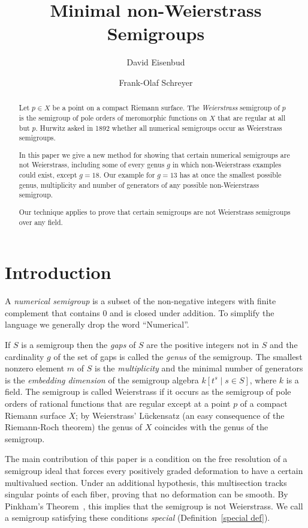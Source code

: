 \documentclass[twoside,12pt, leqno]{amsart}
\author[David Eisenbud]{David Eisenbud}
\author[Frank-Olaf Schreyer]{Frank-Olaf Schreyer}
\title{Minimal  non-Weierstrass Semigroups}
\theoremstyle{definition}
\begin{document}
\begin{abstract}
Let $p\in X$ be a point on a compact Riemann surface. The \emph{Weierstrass} semigroup of $p$ is  the semigroup of pole orders
of meromorphic functions on $X$ that are regular at all but $p$. Hurwitz asked in 1892 
whether all numerical semigroups occur as Weierstrass semigroups. 

In this paper we give a new method  for showing that certain numerical semigroups are not Weierstrass, including some
of every genus $g$ in which non-Weierstrass examples could exist, except $g =18$. Our example for $g=13$ has at once the smallest possible genus, multiplicity
and number of generators of any possible non-Weierstrass semigroup.
 
 Our technique applies to prove that certain semigroups are not Weierstrass semigroups over any field. 
\end{abstract}
\maketitle

\section*{Introduction}

A \emph{numerical semigroup} is a subset of the non-negative integers
with finite complement that contains 0 and is closed under addition. To simplify the
language we generally drop the word ``Numerical''. 

If $S$ is a semigroup then the \emph{gaps} of $S$ are the positive integers
not in $S$ and the cardinality $g$ of the set of gaps is called
the \emph{genus} of the semigroup. The smallest nonzero element $m$ of $S$
is the \emph{multiplicity} and the minimal number of generators is the
\emph{ embedding dimension}  of the semigroup algebra
$k[t^{s} \mid s\in S]$, where $k$ is a field. The semigroup is called Weierstrass if
it occurs as the semigroup of pole orders of rational functions that are regular
except at a point $p$ of a compact Riemann surface $X$; by Weierstrass' L\"uckensatz (an easy consequence of the Riemann-Roch theorem) the genus
of $X$ coincides with the genus of the semigroup. 

The main contribution of this paper is a condition  on the free resolution of a semigroup ideal that forces every positively graded deformation to have a certain multivalued
section.  Under an additional hypothesis, this multisection tracks singular points of each fiber, proving
that no deformation can be smooth. By Pinkham's Theorem~\cite[Chapter IV]{MR376672}, this implies that the semigroup is not Weierstrass. We call a semigroup satisfying these conditions \emph{special} (Definition~\ref{special def}).
\end{document}
